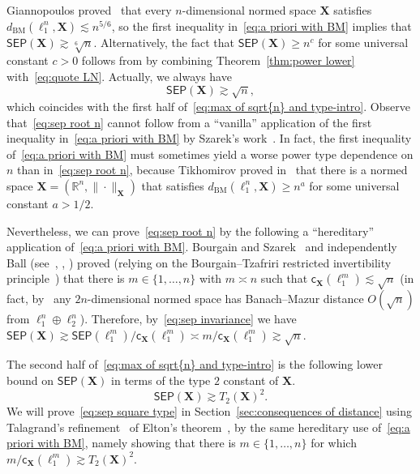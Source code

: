 \documentclass[11pt,reqno]{amsart}
\renewcommand{\ge}{\geqslant}
\newcommand{\cc}{\mathsf{c}}
\newcommand{\n}{\{1,\ldots,n\}}
\newcommand{\X}{\mathbf X}
\newcommand{\R}{\mathbb R}
\theoremstyle{remark}
\newcommand{\BM}{\mathrm{BM}}
\renewcommand{\1}{\mathbf 1}
\newcommand{\sep}{\mathsf{SEP}}
\begin{document}
 Giannopoulos proved~\cite{Gia95} that every $n$-dimensional normed space $\X$ satisfies $d_{\BM}(\ell_1^n,\X)\lesssim n^{5/6}$,  so the first inequality in~\eqref{eq:a priori with BM} implies that $\sep(\X)\gtrsim \sqrt[6]{n}$. Alternatively, the fact that $\sep(\X)\ge n^{c}$ for some universal constant $c>0$  follows from by combining Theorem~\ref{thm:power lower}  with~\eqref{eq:quote LN}. Actually, we always have
 \begin{equation}\label{eq:sep root n}
 \sep(\X)\gtrsim \sqrt{n},
  \end{equation}
  which coincides with the first half of~\eqref{eq:max of sqrt{n} and type-intro}. Observe that~\eqref{eq:sep root n} cannot follow from a ``vanilla'' application of the first inequality in~\eqref{eq:a priori with BM} by Szarek's work~\cite{Sza90}. In fact, the first inequality of~\eqref{eq:a priori with BM} must sometimes yield a worse power type dependence on $n$ than in~\eqref{eq:sep root n}, because Tikhomirov proved in~\cite{Tik19} that there is a normed space $\X=(\R^n,\|\cdot\|_\X)$ that satisfies $d_{\BM}(\ell_1^n,\X)\ge n^a$ for some universal constant  $a>1/2$.

  Nevertheless, we can prove~\eqref{eq:sep root n} by the following a ``hereditary'' application of~\eqref{eq:a priori with BM}. Bourgain and Szarek~\cite{BS88} and independently Ball (see~\cite[Remark~7]{BS88}, \cite[Remark~7]{Sza91}, \cite[page~138]{Tom89}) proved (relying on the Bourgain--Tzafriri restricted invertibility principle~\cite{BT87}) that there is $m\in \n$ with $m\asymp n$ such that $\cc_{\X}(\ell_1^m)\lesssim \sqrt{n}$ (in fact, by~\cite{BS88} any $2n$-dimensional normed space has Banach--Mazur distance $O(\sqrt{n})$ from $\ell_1^n\oplus \ell_2^n$). Therefore, by~\eqref{eq:sep invariance} we have $\sep(\X)\gtrsim \sep(\ell_1^m)/\cc_\X(\ell_1^m)\asymp m/\cc_\X(\ell_1^m)\gtrsim \sqrt{n}$.

  The second half of~\eqref{eq:max of sqrt{n} and type-intro} is the following lower bound on $\sep(\X)$ in terms of the type $2$ constant of $\X$.
  \begin{equation}\label{eq:sep square type}
  \sep(\X)\gtrsim T_2(\X)^2.
  \end{equation}
We will prove~\eqref{eq:sep square type} in Section~\ref{sec:consequences of distance}  using Talagrand's refinement~\cite{Tal-elton92} of Elton's theorem~\cite{Elt83}, by the same hereditary use of~\eqref{eq:a priori with BM}, namely showing that there is $m\in \n$ for which $m/\cc_\X(\ell_1^m)\gtrsim T_2(\X)^2$.
\end{document}
